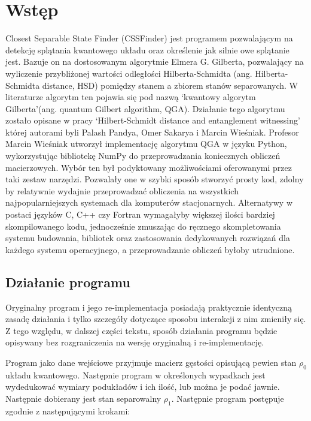 \documentclass[11pt, a4paper]{article}
\begin{document}
  \begin{sloppypar}
    \section{Wstęp}
    Closest Separable State Finder (CSSFinder) jest programem pozwalającym na detekcję splątania
    kwantowego układu oraz określenie jak silnie owe splątanie jest. Bazuje on na
    dostosowanym algorytmie Elmera G. Gilberta, pozwalający na wyliczenie przybliżonej
    wartości odległości Hilberta-Schmidta (ang. Hilberta-Schmidta distance, HSD)
    pomiędzy stanem a zbiorem stanów separowanych. W literaturze algorytm ten pojawia się
    pod nazwą `kwantowy algorytm Gilberta'(ang. quantum Gilbert algorithm, QGA)\cite{MW_Variational_approach}.
    Działanie tego algorytmu zostało opisane w pracy `Hilbert-Schmidt distance and entanglement
    witnessing' której autorami byli Palash Pandya, Omer Sakarya i Marcin Wieśniak\cite{MW_Hilbert_Schmidt_distance}.
    Profesor Marcin Wieśniak utworzył implementację algorytmu QGA w języku Python,
    wykorzystując bibliotekę NumPy do przeprowadzania koniecznych obliczeń macierzowych.
    Wybór ten był podyktowany możliwościami oferowanymi przez taki zestaw narzędzi.
    Pozwalały one w szybki sposób stworzyć prosty kod, zdolny by relatywnie wydajnie przeprowadzać
    obliczenia na wszystkich najpopularniejszych systemach dla komputerów stacjonarnych.
    Alternatywy w postaci języków C, C++ czy Fortran wymagałyby większej ilości bardziej
    skompilowanego kodu, jednocześnie zmuszając do ręcznego skompletowania systemu
    budowania, bibliotek oraz zastosowania dedykowanych rozwiązań dla każdego systemu operacyjnego,
    a przeprowadzanie obliczeń byłoby utrudnione.

    \subsection{Działanie programu}
    Oryginalny program i jego re-implementacja posiadają praktycznie identyczną zasadę
    działania i tylko szczegóły dotyczące sposobu interakcji z nim zmieniły się. Z tego względu,
    w dalszej części tekstu, sposób działania programu będzie opisywany bez rozgraniczenia
    na wersję oryginalną i re-implementację.

    Program jako dane wejściowe przyjmuje macierz gęstości opisującą pewien stan $\rho_{0}$
    układu kwantowego. Następnie program w określonych wypadkach jest wydedukować
    wymiary podukładów i ich ilość, lub można je podać jawnie. Następnie dobierany jest
    stan separowalny $\rho_{1}$. Następnie program postępuje zgodnie z następującymi krokami:


\end{sloppypar}
\end{document}
